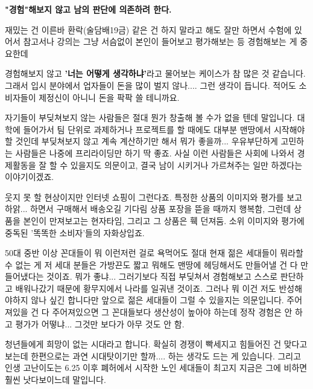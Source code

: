 \vspace{5mm}

\textbf{"경험"해보지 않고 남의 판단에 의존하려 한다.}
\vspace{5mm}

재밌는 건 이른바 환락(술담배19금) 같은 건 하지 말라고 해도 잘만 하면서
수험에 있어서 참고서나 강의는 그냥 서슴없이 본인이 들어보고 평가해보는 등 경험해보는 게 중요한데
\vspace{5mm}

경험해보지 않고 \textbf{'너는 어떻게 생각하냐'}라고 물어보는 케이스가 참 많은 것 같습니다.
그래서 입시 분야에서 업자들이 돈을 많이 벌지 않나.... 그런 생각이 듭니다. 적어도 소비자들이 제정신이 아니니 돈을 팍팍 쓸 테니까요.
\vspace{5mm}

자기들이 부딪쳐보지 않는 사람들은 절대 뭔가 창출해 볼 수가 없을 텐데 말입니다.
대학에 들어가서 팀 단위로 과제하거나 프로젝트를 할 때에도 대부분 맨땅에서 시작해야 할 것인데
부딪쳐보지 않고 계속 계산하기만 해서 뭐가 좋을까... 우유부단하게 고민하는 사람들은 나중에 프리라이딩만 하기 딱 좋죠.
사실 이런 사람들은 사회에 나와서 경제활동을 잘 할 수 있을지도 의문이고, 결국 남이 시키거나 가르쳐주는 일만 하겠다는 이야기이겠죠.
\vspace{5mm}

웃지 못 할 현상이지만 인터넷 쇼핑이 그런다죠.
특정한 상품의 이미지와 평가를 보고 하앍... 하면서 구매해서 배송오길 기다림
상품 포장을 뜯을 때까지 행복함, 그런데 상품을 본인이 만져보고는 현자타임, 그리고 그 상품은 훽 던져둠.
소위 이미지와 평가에 중독된 '똑똑한 소비자'들의 자화상입죠.
\vspace{5mm}

50대 중반 이상 꼰대들이 뭐 이런저런 걸로 욕먹어도 절대 현재 젊은 세대들이 뭐라할 수 없는 게
저 세대 분들은 가방끈도 짧고 뭐해도 맨땅에 헤딩해서도 만들어낼 건 다 만들어냈다는 것이죠.
뭐가 좋냐... 그러기보다 직접 부딪쳐서 경험해보고 스스로 판단하고 배워나갔기 때문에 황무지에서 나라를 일궈낸 것이죠.
그러나 뭐 이건 저도 반성해야하지 않나 싶긴 합니다만 앞으로 젊은 세대들이 그럴 수 있을지는 의문입니다.
주어져있을 건 다 주어져있으면 그 꼰대들보다 생산성이 높아야 하는데 정작 경험은 안 하고 평가가 어떻냐... 그것만 보다가 아무 것도 안 함.
\vspace{5mm}

청년들에게 희망이 없는 시대라고 합니다. 확실히 경쟁이 빡세지고 힘들어진 건 맞다고 보는데
한편으로는 과연 시대탓이기만 할까.... 하는 생각도 드는 게 있습니다.
그리고 인생 고난이도는 6.25 이후 폐허에서 시작한 노인 세대들이 최고지 지금은 그에 비하면 훨씬 낫다보이느데 말입니다.
\vspace{5mm}

